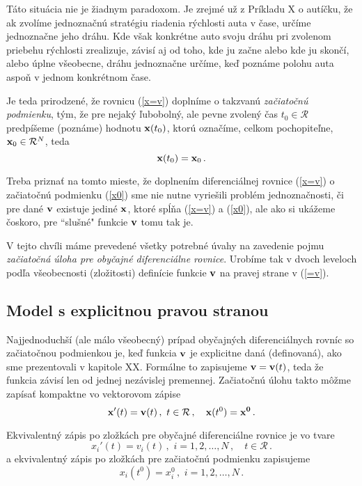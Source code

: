 Táto situácia nie je žiadnym paradoxom. Je zrejmé už z Príkladu X o autíčku, že ak zvolíme jednoznačnú stratégiu riadenia rýchlosti auta v čase, určíme jednoznačne jeho dráhu. Kde však konkrétne auto svoju dráhu pri zvolenom priebehu rýchlosti zrealizuje, závisí aj od toho, kde ju začne alebo kde ju skončí, alebo úplne všeobecne, dráhu jednoznačne určíme, keď poznáme polohu auta aspoň v jednom konkrétnom čase. 

Je teda prirodzené, že rovnicu (\ref{x=v}) doplníme o takzvanú {\it začiatočnú podmienku}, tým, že pre nejaký ľubobolný, ale pevne zvolený čas $t_0 \in \mathcal{R}$  predpíšeme (poznáme) hodnotu ${\bf x}(t_0)$, ktorú označíme, celkom pochopiteľne, ${\bf x}_0 \in \mathcal{R}^N$, teda
\begin{equation}
\label{x0}
{\bf x}(t_0) = {\bf x}_0 \,.
\end{equation}

Treba priznať na tomto mieste, že doplnením diferenciálnej rovnice (\ref{x=v}) o začiatočnú podmienku (\ref{x0}) sme nie nutne vyriešili problém jednoznačnosti, či pre dané ${\bf v}$ existuje jediné ${\bf x}$, ktoré spĺňa (\ref{x=v}) a (\ref{x0}), ale ako si ukážeme čoskoro, pre ``slušné" funkcie ${\bf v}$ tomu tak je.

V tejto chvíli máme prevedené všetky potrebné úvahy na zavedenie pojmu {\it začiatočná úloha pre obyčajné diferenciálne rovnice}. Urobíme tak v dvoch leveloch podľa všeobecnosti (zložitosti) definície funkcie ${\bf v}$ na pravej strane v (\ref{=v}).

\subsection{Model s explicitnou pravou stranou}

Najjednoduchší (ale málo všeobecný) prípad obyčajných diferenciálnych rovníc so začiatočnou podmienkou je, keď funkcia ${\bf v}$ je explicitne daná (definovaná), ako sme prezentovali v kapitole XX. Formálne to zapisujeme ${\bf v}={\bf v}(t)$, teda že funkcia závisí len od jednej nezávislej premennej. Začiatočnú úlohu takto môžme zapísať kompaktne vo vektorovom zápise
\begin{equation}
\label{xx=v}
{\bf x}'(t) = {\bf v}(t) \,, \,\, t \in \mathcal{R} \,, \quad {\bf x}(t^0) = {\bf x^0} \,.
\end{equation}

Ekvivalentný zápis po zložkách pre obyčajné diferenciálne rovnice je vo tvare
\begin{equation}
\label{x=vxxx}
x_i'(t) = v_i(t) \,, \,\, i=1,2,\ldots,N \,, \quad t \in \mathcal{R} \,.
\end{equation}
a ekvivalentný zápis po zložkách pre začiatočnú podmienku zapisujeme
\begin{equation}
\label{xt0}
x_i(t^0) = x_i^0 \,, \,\, i=1,2,\ldots,N \,.
\end{equation}


